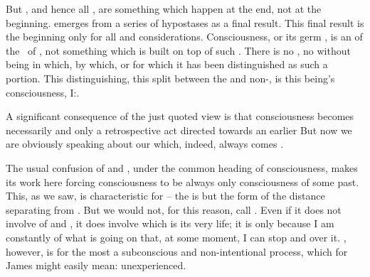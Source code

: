 But , and hence all , are something which
happen at the end, not at the beginning.  emerges from a series of
hypostases as a final result. This final result is the beginning only for all
 and  considerations.  Consciousness, or its germ
, is an  of the \nexus\ of  , not something which is built on top of such
.  There is no , no  without being in which, by which, or for which it has been
distinguished as such a portion. This distinguishing, this split between the
 and non-, is this being's consciousness,
I:.  

\pa A significant consequence of the just quoted view is that consciousness
becomes necessarily and only a retrospective act directed towards an earlier
  But now we are obviously speaking about our
 which, indeed, always comes .

The usual confusion of  and , under the common
heading of consciousness, makes its work here forcing consciousness to be always
only consciousness of some past.  This, as we saw, is characteristic for
 -- the  is but the form of the distance separating
 from .  But we would not, for this reason, call
 .  Even if it does not involve  of  and , it does involve 
which is its very life; it is only because I am constantly  of what is
going on that, at some moment, I can stop and  over it.
, however, is for the most a subconscious and non-intentional
process, which for James might easily mean: unexperienced.

